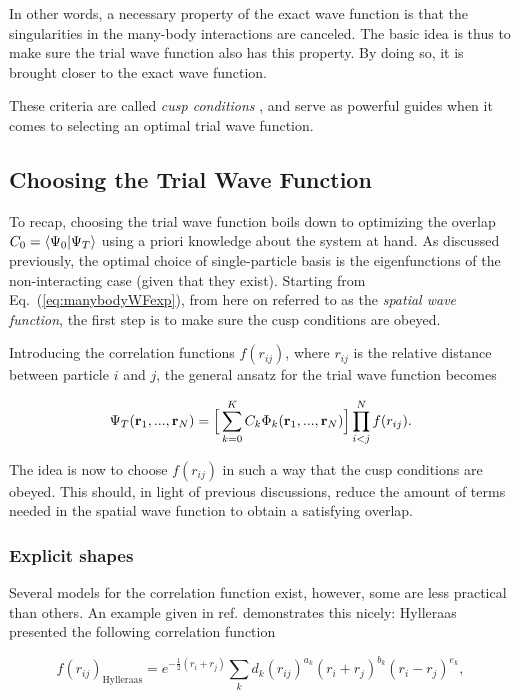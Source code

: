 In other words, a necessary property of the exact wave function is that the singularities in the many-body interactions are canceled. The basic idea is thus to make sure the trial wave function also has this property. By doing so, it is brought closer to the exact wave function.

These criteria are called \textit{cusp conditions} \cite{morten}, and serve as powerful guides when it comes to selecting an optimal trial wave function. 


\subsection{Choosing the Trial Wave Function}
\label{sec:ChoiceTrialWF}

To recap, choosing the trial wave function boils down to optimizing the overlap $C_0 = \left\langle \Psi_0 | \Psi_T\right\rangle$ using a priori knowledge about the system at hand. As discussed previously, the optimal choice of single-particle basis is the eigenfunctions of the non-interacting case (given that they exist). Starting from Eq.~(\ref{eq:manybodyWFexp}), from here on referred to as the \textit{spatial wave function}, the first step is to make sure the cusp conditions are obeyed.

Introducing the correlation functions $f(r_{ij})$, where $r_{ij}$ is the relative distance between particle $i$ and $j$, the general ansatz for the trial wave function becomes

\begin{equation}
\label{eq:firstAnzatsTWF}
 \Psi_T(\mathbf{r}_1, ..., \mathbf{r}_N) = \Big[\sum_{k=0}^K C_k\Phi_k(\mathbf{r}_1, ..., \mathbf{r}_N)\Big]\prod_{i<j}^Nf(r_{ij}).
\end{equation}

The idea is now to choose $f(r_{ij})$ in such a way that the cusp conditions are obeyed. This should, in light of previous discussions, reduce the amount of terms needed in the spatial wave function to obtain a satisfying overlap.

\subsubsection{Explicit shapes}

Several models for the correlation function exist, however, some are less practical than others. An example given in ref. \cite{abInitioMC} demonstrates this nicely: Hylleraas presented the following correlation function 

\begin{equation}
 f(r_{ij})_\mathrm{Hylleraas} = e^{-\frac{1}{2} (r_i + r_j)}\sum_k d_k(r_{ij})^{a_k} (r_i + r_j)^{b_k}(r_i - r_j)^{e_k},
\end{equation}

